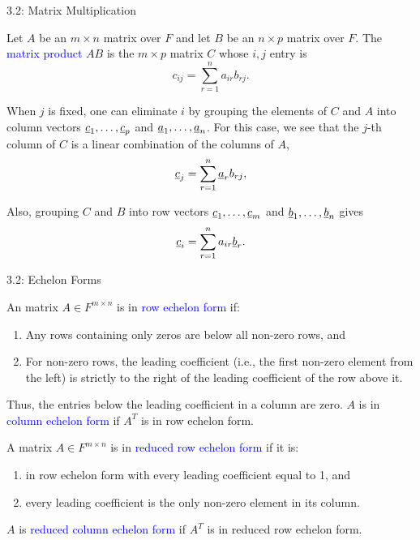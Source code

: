 \documentclass[10pt,letterpaper,english]{beamer}
\begin{document}
\begin{frame}{3.2: Matrix Multiplication}

\begin{definition}
Let $A$ be an $m \times n$ matrix over $F$ and let $B$ be an $n \times p$ matrix over $F$.
The \textcolor{blue}{matrix product} $AB$ is the $m \times p$ matrix $C$ whose $i,j$ entry is \vspace{-2mm}
\begin{equation*} \label{eq:def_matrix_product}
c_{ij} = \sum_{r = 1}^n a_{ir} b_{rj}.
\end{equation*}
\end{definition}


\begin{example}
When $j$ is fixed, one can eliminate $i$ by grouping the elements of $C$ and $A$ into column vectors $\underline{c}_1,\ldots,\underline{c}_{p}$ and $\underline{a}_1,\ldots,\underline{a}_n$. For this case, we see that the $j$-th column of $C$ is a linear combination of the columns of $A$, \vspace{-2mm}
\[ \underline{c}_{j} = \sum_{r = 1}^n \underline{a}_r b_{rj}, \]

Also, grouping $C$ and $B$ into row vectors  $\underline{c}_1,\ldots,\underline{c}_{m}$ and $\underline{b}_1,\ldots,\underline{b}_n$ gives \vspace{-2mm}
\[ \underline{c}_{i} = \sum_{r = 1}^n a_{ir} \underline{b}_r. \]
\end{example}

\end{frame}


\begin{frame}{3.2: Echelon Forms}

\begin{definition}
An matrix $A \in F^{m\times n}$ is in \textcolor{blue}{row echelon form} if:
\begin{enumerate}
\item Any rows containing only zeros are below all non-zero rows, and
\item For non-zero rows, the leading coefficient (i.e., the first non-zero element from the left) is strictly to the right of the leading coefficient of the row above it.
\end{enumerate}
Thus, the entries below the leading coefficient in a column are zero.
$A$ is in \textcolor{blue}{column echelon form} if $A^T$ is in row echelon form.
\end{definition}

\begin{definition}
A matrix $A \in F^{m\times n}$ is in \textcolor{blue}{reduced row echelon form} if it is:
\begin{enumerate}
\item in row echelon form with every leading coefficient equal to 1, and
\item every leading coefficient is the only non-zero element in its column.
\end{enumerate}
$A$ is \textcolor{blue}{reduced column echelon form} if $A^T$ is in reduced row echelon form.
\end{definition}

\end{frame}
\end{document}
